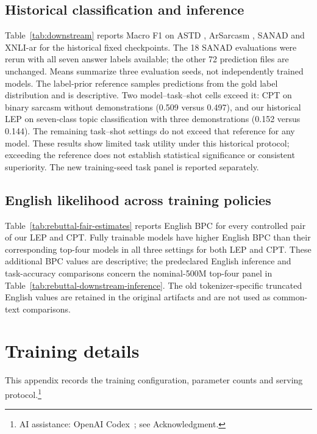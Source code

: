 \documentclass{ieeeaccess}
\begin{document}
\subsection*{Historical classification and inference}
Table~\ref{tab:downstream} reports Macro F1 on ASTD \cite{nabil2015astd},
ArSarcasm \cite{abufarha2020arsarcasm}, SANAD \cite{einea2019sanad} and
XNLI-ar \cite{conneau2018xnli} for the historical fixed checkpoints.
The 18 SANAD evaluations were rerun with all seven answer labels available;
the other 72 prediction files are unchanged. Means summarize three
evaluation seeds, not independently trained models. The label-prior reference
samples predictions from the gold label distribution and is descriptive.
Two model--task--shot cells exceed it: CPT on binary sarcasm without
demonstrations (0.509 versus 0.497), and our historical LEP on seven-class topic
classification with three demonstrations (0.152 versus 0.144).
The remaining task--shot settings do not exceed that reference for any model.
These results show limited task utility under this historical protocol;
exceeding the reference does not establish statistical significance or
consistent superiority. The new training-seed task panel is reported separately.



\subsection*{English likelihood across training policies}
Table~\ref{tab:rebuttal-fair-estimates} reports English BPC for every
controlled pair of our LEP and CPT. Fully trainable models have higher English BPC than
their corresponding top-four models in all three settings for both LEP
and CPT. These additional BPC values are descriptive; the predeclared
English inference and task-accuracy comparisons concern the nominal-500M
top-four panel in Table~\ref{tab:rebuttal-downstream-inference}.
The old tokenizer-specific truncated English values are retained in the
original artifacts and are not used as common-text comparisons.

\section{Training details}
\label{app:hparams}

This appendix records the training configuration, parameter counts and
serving protocol.\footnote{AI assistance: OpenAI Codex~\cite{openaicodex2026}; see Acknowledgment.}
\end{document}
